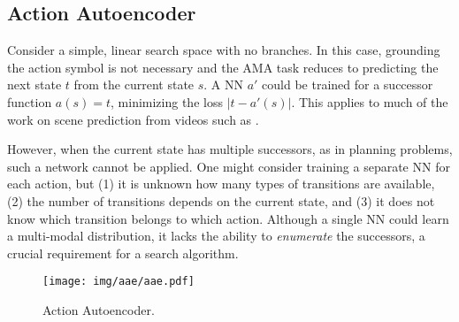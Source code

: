\documentclass[11pt]{article}
\begin{document}
\subsection{Action Autoencoder}

Consider a simple, linear search space with no branches.
In this case, grounding the action symbol is not necessary and
the AMA task reduces to predicting the next state $t$ from the current state $s$.
A NN $a'$ could be trained for a successor function $a(s)=t$, minimizing the loss $|t-a'(s)|$.
This applies to much of the work on scene prediction from videos such as \cite{srivastava2015unsupervised}. %


However, when the current state has multiple successors, as in planning problems, such a network cannot be applied.
One might consider training a separate NN for each action, but
(1) it is unknown how many types of transitions are available,
(2) the number of transitions depends on the current state, and
(3) it does not know which transition belongs to which action.
Although a single NN could learn a multi-modal distribution,
it lacks the ability to \emph{enumerate} the successors,
a crucial requirement for a search algorithm.

\begin{figure}[tbp]
 \centering
 \texttt{[image: img/aae/aae.pdf]}
 \caption{Action Autoencoder.}
 \label{fig:aae}
\end{figure}
\end{document}

